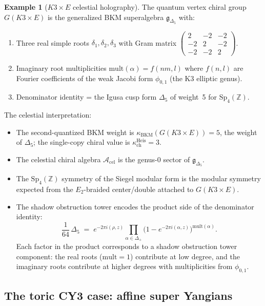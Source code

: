 \documentclass[11pt]{article}
\theoremstyle{definition}
\newtheorem{example}[theorem]{Example}
\theoremstyle{remark}
\newcommand{\cA}{\mathcal{A}}
\newcommand{\frakg}{\mathfrak{g}}
\begin{document}
\begin{example}[$K3 \times E$ celestial holography]
\label{ex:k3-e-celestial}
The quantum vertex chiral group $G(K3 \times E)$ is the
generalized BKM superalgebra $\frakg_{\Delta_5}$ with:
\begin{enumerate}[label=(\alph*)]
\item Three real simple roots $\delta_1, \delta_2, \delta_3$ with
 Gram matrix
 $\left(\begin{smallmatrix}
 2 & -2 & -2 \\ -2 & 2 & -2 \\ -2 & -2 & 2
 \end{smallmatrix}\right)$.
\item Imaginary root multiplicities
 $\mathrm{mult}(\alpha) = f(nm, l)$ where $f(n,l)$ are Fourier
 coefficients of the weak Jacobi form $\phi_{0,1}$ (the K3
 elliptic genus).
\item Denominator identity = the Igusa cusp form $\Delta_5$ of
 weight~5 for $\mathrm{Sp}_4(\mathbb{Z})$.
\end{enumerate}

The celestial interpretation:
\begin{itemize}
\item The second-quantized BKM weight is
 $\kappa_{\mathrm{BKM}}(G(K3 \times E)) = 5$, the weight of $\Delta_5$;
 the single-copy chiral value is $\kappa_{\mathrm{ch}}^{\mathrm{Heis}}=3$.
\item The celestial chiral algebra $\cA_{\mathrm{cel}}$ is the
 genus-0 sector of $\frakg_{\Delta_5}$.
\item The $\mathrm{Sp}_4(\mathbb{Z})$ symmetry of the Siegel
 modular form is the modular symmetry expected from the $E_2$-braided
 center/double attached to $G(K3 \times E)$.
\item The shadow obstruction tower encodes the product side of the denominator
 identity:
 \[
 \frac{1}{64}\,\Delta_5
 \;=\;
 e^{-2\pi i(\rho, z)}
 \prod_{\alpha \in \Delta_+}
 \bigl(1 - e^{-2\pi i(\alpha, z)}\bigr)^{\mathrm{mult}(\alpha)}.
 \]
 Each factor in the product corresponds to a shadow obstruction tower
 component: the real roots ($\mathrm{mult} = 1$) contribute at
 low degree, and the imaginary roots contribute at higher degrees
 with multiplicities from $\phi_{0,1}$.
\end{itemize}
\end{example}

\subsection{The toric CY3 case: affine super Yangians}
\end{document}
